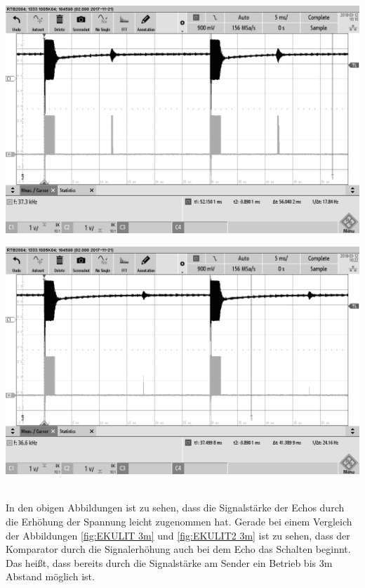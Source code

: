 \begin{minipage}{0.5\textwidth}
\includegraphics[width=1\textwidth%
]{Abbildungen/MessungenP2/15,75V/EKULIT2m.png}
\label{fig:EKULIT2 2m}
\end{minipage}
\begin{minipage}{0.5\textwidth}
\includegraphics[width=1\textwidth%
]{Abbildungen/MessungenP2/15,75V/EKULIT3m.png}
\label{fig:EKULIT2 3m}
\end{minipage}\\
In den obigen Abbildungen ist zu sehen, dass die Signalstärke der Echos durch die Erhöhung der Spannung leicht zugenommen hat. Gerade bei einem Vergleich der Abbildungen \ref{fig:EKULIT 3m} und \ref{fig:EKULIT2 3m} ist zu sehen, dass der Komparator durch die Signalerhöhung auch bei dem Echo das Schalten beginnt. Das heißt, dass bereits durch die Signalstärke am Sender ein Betrieb bis 3m Abstand möglich ist.




























